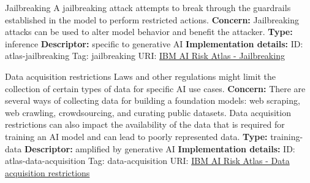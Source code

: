 \documentclass[a4paper,12pt]{article}
\begin{document}
\begin{definitionbox}{Jailbreaking}
A jailbreaking attack attempts to break through the guardrails established in the model to perform restricted actions.\newline\newline
\textbf{Concern: }Jailbreaking attacks can be used to alter model behavior and benefit the attacker.\newline\newline
\textbf{Type: }inference\newline
\textbf{Descriptor: }specific to generative AI \newline\newline
\textbf{Implementation details: } \newline
ID: atlas-jailbreaking \newline
Tag: jailbreaking \newline
URI:  \href{https://www.ibm.com/docs/en/watsonx/saas?topic=SSYOK8/wsj/ai-risk-atlas/jailbreaking.html}{IBM AI Risk Atlas - Jailbreaking}\newline
\end{definitionbox}
\begin{definitionbox}{Data acquisition restrictions}
Laws and other regulations might limit the collection of certain types of data for specific AI use cases.\newline\newline
\textbf{Concern: }There are several ways of collecting data for building a foundation models: web scraping, web crawling, crowdsourcing, and curating public datasets. Data acquisition restrictions can also impact the availability of the data that is required for training an AI model and can lead to poorly represented data.\newline\newline
\textbf{Type: }training-data\newline
\textbf{Descriptor: }amplified by generative AI \newline\newline
\textbf{Implementation details: } \newline
ID: atlas-data-acquisition \newline
Tag: data-acquisition \newline
URI:  \href{https://www.ibm.com/docs/en/watsonx/saas?topic=SSYOK8/wsj/ai-risk-atlas/data-acquisition.html}{IBM AI Risk Atlas - Data acquisition restrictions}\newline
\end{definitionbox}
\end{document}
